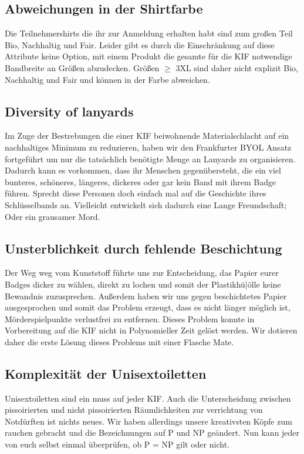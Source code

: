 \subsection*{Abweichungen in der Shirtfarbe}
Die Teilnehmershirts die ihr zur Anmeldung erhalten habt sind zum großen Teil Bio, Nachhaltig und
Fair. Leider gibt es durch die Einschränkung auf diese Attribute keine Option, mit einem Produkt die
gesamte für die KIF notwendige Bandbreite an Größen abzudecken. Größen $\geq$ 3XL sind daher nicht
explizit Bio, Nachhaltig und Fair und können in der Farbe abweichen.

\subsection*{Diversity of lanyards}
Im Zuge der Bestrebungen die einer KIF beiwohnende Materialschlacht auf ein nachhaltiges Minimum zu
reduzieren, haben wir den Frankfurter BYOL Ansatz fortgeführt um nur die tatsächlich benötigte Menge
an Lanyards zu organisieren. Dadurch kann es vorkommen, dass ihr Menschen gegenübersteht, die ein
viel bunteres, schöneres, längeres, dickeres oder gar kein Band mit ihrem Badge führen. Sprecht
diese Personen doch einfach mal auf die Geschichte ihres Schlüsselbands an. Vielleicht entwickelt
sich dadurch eine Lange Freundschaft; Oder ein grausamer Mord.

\subsection*{Unsterblichkeit durch fehlende Beschichtung}
Der Weg weg vom Kunststoff führte uns zur Entscheidung, das Papier eurer Badges dicker zu wählen,
direkt zu lochen und somit der Plastikh{ü|ö}lle keine Bewandnis zuzusprechen. Außerdem haben wir uns
gegen beschichtetes Papier ausgesprochen und somit das Problem erzeugt, dass es nicht länger möglich
ist, Mörderspielpunkte verlustfrei zu entfernen. Dieses Problem konnte in Vorbereitung auf die KIF
nicht in Polynomieller Zeit gelöst werden. Wir dotieren daher die erste Lösung dieses Problems mit
einer Flasche Mate.

\subsection*{Komplexität der Unisextoiletten}
Unisextoiletten sind ein muss auf jeder KIF. Auch die Unterscheidung zwischen pissoirierten und
nicht pissoirierten Räumlichkeiten zur verrichtung von Notdürften ist nichts neues. Wir haben
allerdings unsere kreativsten Köpfe zum rauchen gebracht und die Bezeichnungen auf P und NP
geändert. Nun kann jeder von euch selbst einmal überprüfen, ob P = NP gilt oder nicht.


